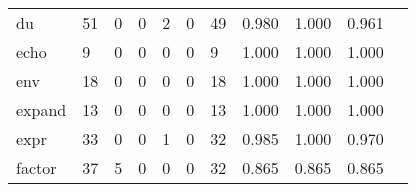 \begin{longtable}{lp{1.2cm}p{1.2cm}p{1.2cm}p{1.2cm}p{1.2cm}p{1.2cm}p{1.2cm}p{1.2cm}p{1.2cm}p{1.2cm}}
du        &                                    51 &                                                  0 &                                                  0 &                                                  2 &                                                  0 &                                                 49 &                                              0.980 &                                              1.000 &                                              0.961 \\
echo      &                                     9 &                                                  0 &                                                  0 &                                                  0 &                                                  0 &                                                  9 &                                              1.000 &                                              1.000 &                                              1.000 \\
env       &                                    18 &                                                  0 &                                                  0 &                                                  0 &                                                  0 &                                                 18 &                                              1.000 &                                              1.000 &                                              1.000 \\
expand    &                                    13 &                                                  0 &                                                  0 &                                                  0 &                                                  0 &                                                 13 &                                              1.000 &                                              1.000 &                                              1.000 \\
expr      &                                    33 &                                                  0 &                                                  0 &                                                  1 &                                                  0 &                                                 32 &                                              0.985 &                                              1.000 &                                              0.970 \\
factor    &                                    37 &                                                  5 &                                                  0 &                                                  0 &                                                  0 &                                                 32 &                                              0.865 &                                              0.865 &                                              0.865 \\

\end{longtable}
